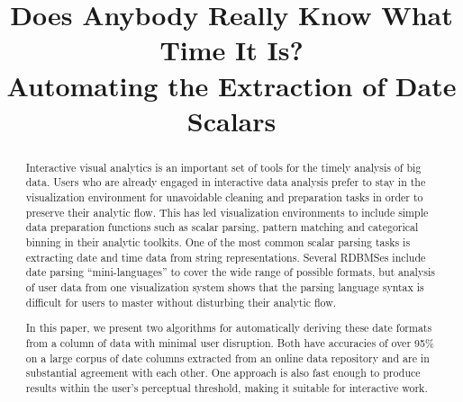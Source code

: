 \documentclass[conference]{IEEEtran}
\begin{document}
\title{Does Anybody Really Know What Time It Is?\\
Automating the Extraction of Date Scalars}


\maketitle
\begin{abstract}
Interactive visual analytics is an important set of tools for the timely analysis of big data. Users who are already engaged in interactive data analysis prefer to stay in the visualization environment for unavoidable cleaning and preparation tasks in order to preserve their analytic flow. This has led visualization environments to include simple data preparation functions such as scalar parsing, pattern matching and categorical binning in their analytic toolkits. One of the most common scalar parsing tasks is extracting date and time data from string representations. Several RDBMSes include date parsing ``mini-languages'' to cover the wide range of possible formats, but analysis of user data from one visualization system shows that the parsing language syntax is difficult for users to master without disturbing their analytic flow.

In this paper, we present two algorithms for automatically deriving these date formats from a column of data with minimal user disruption. Both have accuracies of over 95\% on a large corpus of date columns extracted from an online data repository and are in substantial agreement with each other. One approach is also fast enough to produce results within the user's perceptual threshold, making it suitable for interactive work.
\end{abstract}
\end{document}
